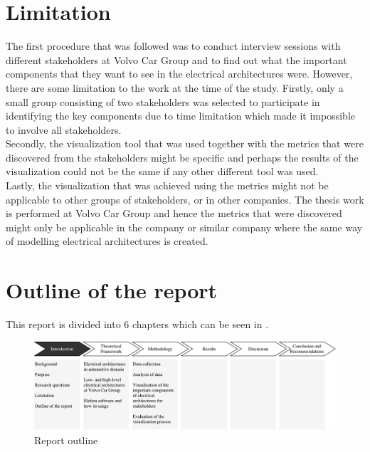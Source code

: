 \section{Limitation} \label{Limitation_ref}
The first procedure that was followed was to conduct interview sessions with different stakeholders at Volvo Car Group and to find out what the important components that they want to see in the electrical architectures were. However, there are some limitation to the work at the time of the study. Firstly, only a small group consisting of two stakeholders was selected to participate in identifying the key components due to time limitation which made it impossible to involve all stakeholders. \\

Secondly, the visualization tool that was used together with the metrics that were discovered from the stakeholders might be specific and perhaps the results of the visualization could not be the same if any other different tool was used. \\

Lastly, the visualization that was achieved using the metrics might not be applicable to other groups of stakeholders, or in other companies. The thesis work is performed at Volvo Car Group and hence the metrics that were discovered might only be applicable in the company or similar company where the same way of modelling electrical architectures is created.


\section{Outline of the report} \label{Outline_ref}
This report is divided into 6 chapters which can be seen in . 
\begin{figure}[H]
\centering
\captionsetup{justification=centering}
\vspace{0cm}%
\includegraphics[width=1\linewidth]{figure/report_outline.pdf}
\caption{Report outline}
\end{figure}